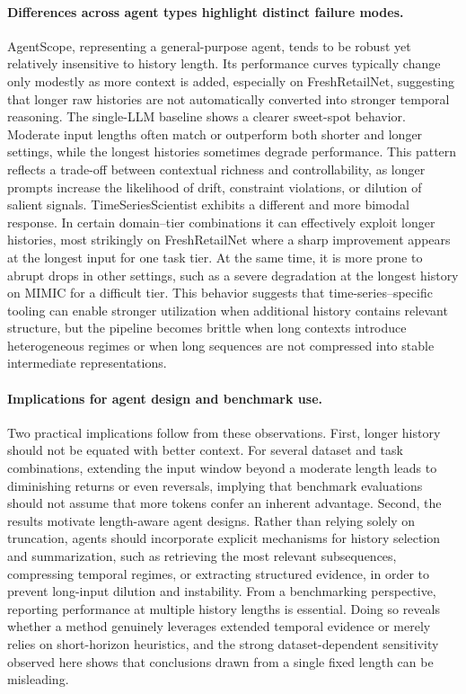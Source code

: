 \paragraph{Differences across agent types highlight distinct failure modes.}
AgentScope, representing a general-purpose agent, tends to be robust yet relatively insensitive to history length.
Its performance curves typically change only modestly as more context is added, especially on FreshRetailNet, suggesting that longer raw histories are not automatically converted into stronger temporal reasoning.
The single-LLM baseline shows a clearer sweet-spot behavior.
Moderate input lengths often match or outperform both shorter and longer settings, while the longest histories sometimes degrade performance.
This pattern reflects a trade-off between contextual richness and controllability, as longer prompts increase the likelihood of drift, constraint violations, or dilution of salient signals.
TimeSeriesScientist exhibits a different and more bimodal response.
In certain domain–tier combinations it can effectively exploit longer histories, most strikingly on FreshRetailNet where a sharp improvement appears at the longest input for one task tier.
At the same time, it is more prone to abrupt drops in other settings, such as a severe degradation at the longest history on MIMIC for a difficult tier.
This behavior suggests that time-series–specific tooling can enable stronger utilization when additional history contains relevant structure, but the pipeline becomes brittle when long contexts introduce heterogeneous regimes or when long sequences are not compressed into stable intermediate representations.

\paragraph{Implications for agent design and benchmark use.}
Two practical implications follow from these observations.
First, longer history should not be equated with better context.
For several dataset and task combinations, extending the input window beyond a moderate length leads to diminishing returns or even reversals, implying that benchmark evaluations should not assume that more tokens confer an inherent advantage.
Second, the results motivate length-aware agent designs.
Rather than relying solely on truncation, agents should incorporate explicit mechanisms for history selection and summarization, such as retrieving the most relevant subsequences, compressing temporal regimes, or extracting structured evidence, in order to prevent long-input dilution and instability.
From a benchmarking perspective, reporting performance at multiple history lengths is essential.
Doing so reveals whether a method genuinely leverages extended temporal evidence or merely relies on short-horizon heuristics, and the strong dataset-dependent sensitivity observed here shows that conclusions drawn from a single fixed length can be misleading.

